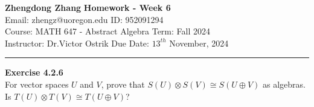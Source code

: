 \documentclass[a4paper, 12pt]{article}
\newenvironment{problem}[2][Exercise]
    { \begin{mdframed}[backgroundcolor=gray!20] \textbf{#1 #2} \\}
    {  \end{mdframed}}
\begin{document}
\noindent
\large\textbf{Zhengdong Zhang} \hfill \textbf{Homework - Week 6}   \\
Email: zhengz@uoregon.edu \hfill ID: 952091294 \\
\normalsize Course: MATH 647 - Abstract Algebra  \hfill Term: Fall 2024\\
Instructor: Dr.Victor Ostrik \hfill Due Date: $13^{th}$ November, 2024 \\
\noindent\rule{7in}{2.8pt}
\begin{problem}{4.2.6}
For vector spaces \(U\) and \(V\), prove that \(S(U)\otimes S(V)\cong S(U\oplus V)\) as algebras. Is \(T(U)\otimes T(V)\cong T(U\oplus V)\)?
\end{problem}
\end{document}
